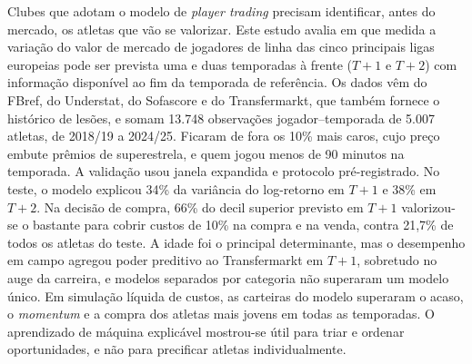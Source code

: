 \documentclass[article, 12pt, oneside, a4paper, english, brazil, section=TITLE]{abntex2}
\begin{document}
\imprimircabecalho

\begin{resumo}
Clubes que adotam o modelo de \textit{player trading} precisam identificar, antes do mercado, os atletas que vão se valorizar.
Este estudo avalia em que medida a variação do valor de mercado de jogadores de linha das cinco principais ligas europeias pode ser prevista uma e duas temporadas à frente ($T+1$ e $T+2$) com informação disponível ao fim da temporada de referência.
Os dados vêm do FBref, do Understat, do Sofascore e do Transfermarkt, que também fornece o histórico de lesões, e somam 13.748 observações jogador–temporada de 5.007 atletas, de 2018/19 a 2024/25.
Ficaram de fora os 10\% mais caros, cujo preço embute prêmios de superestrela, e quem jogou menos de 90 minutos na temporada.
A validação usou janela expandida e protocolo pré-registrado.
No teste, o modelo explicou 34\% da variância do log-retorno em $T+1$ e 38\% em $T+2$.
Na decisão de compra, 66\% do decil superior previsto em $T+1$ valorizou-se o bastante para cobrir custos de 10\% na compra e na venda, contra 21,7\% de todos os atletas do teste.
A idade foi o principal determinante, mas o desempenho em campo agregou poder preditivo ao Transfermarkt em $T+1$, sobretudo no auge da carreira, e modelos separados por categoria não superaram um modelo único.
Em simulação líquida de custos, as carteiras do modelo superaram o acaso, o \textit{momentum} e a compra dos atletas mais jovens em todas as temporadas.
O aprendizado de máquina explicável mostrou-se útil para triar e ordenar oportunidades, e não para precificar atletas individualmente.
\end{resumo}

\begin{abstract}
Clubs that follow a player-trading model must identify, ahead of the market, the players whose value will rise.
This study assesses to what extent the change in market value of outfield players in the five major European leagues can be forecast one and two seasons ahead ($T+1$ and $T+2$) with information available at the end of the reference season.
The data come from FBref, Understat, Sofascore and Transfermarkt, which also supplies injury histories, and comprise 13,748 player–season observations of 5,007 players from 2018/19 to 2024/25.
The 10\% most valuable players, whose prices carry superstar premiums, and those who played fewer than 90 minutes in the season were excluded.
Models were trained and tested in an expanding window, under a protocol registered before the test was revealed.
On the test set, the model explained 34\% of the log-return variance at $T+1$ and 38\% at $T+2$.
As a buying rule, 66\% of the top predicted decile at $T+1$ appreciated enough to cover 10\% buying and selling costs, against 21.7\% of all test players.
Age was the main driver, but on-field performance added predictive power to Transfermarkt at $T+1$, mainly at peak age, and category-specific models did not outperform a single model.
In a cost-adjusted simulation, the model's portfolios beat random selection, momentum and buying the youngest players in every season.
Explainable machine learning proved useful for screening and ranking opportunities rather than for pricing individual players.
\end{abstract}
\end{document}
